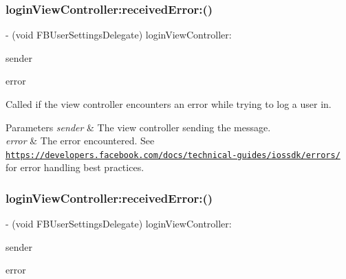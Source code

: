 \subsubsection{\texorpdfstring{login\+View\+Controller\+:received\+Error\+:()}{loginViewController:receivedError:()}\hspace{0.1cm}{\footnotesize\ttfamily [4/5]}}
{\footnotesize\ttfamily -\/ (void F\+B\+User\+Settings\+Delegate) login\+View\+Controller\+: \begin{DoxyParamCaption}\item[{(id)}]{sender }\item[{receivedError:(N\+S\+Error $\ast$)}]{error }\end{DoxyParamCaption}\hspace{0.3cm}{\ttfamily [optional]}}

Called if the view controller encounters an error while trying to log a user in.


\begin{DoxyParams}{Parameters}
{\em sender} & The view controller sending the message. \\
\hline
{\em error} & The error encountered.  See \href{https://developers.facebook.com/docs/technical-guides/iossdk/errors/}{\tt https\+://developers.\+facebook.\+com/docs/technical-\/guides/iossdk/errors/} for error handling best practices. \\
\hline
\end{DoxyParams}
\mbox{\label{protocolFBUserSettingsDelegate_01-p_aa7340081c0402e123cdde904f5cf2c91}} 
\subsubsection{\texorpdfstring{login\+View\+Controller\+:received\+Error\+:()}{loginViewController:receivedError:()}\hspace{0.1cm}{\footnotesize\ttfamily [5/5]}}
{\footnotesize\ttfamily -\/ (void F\+B\+User\+Settings\+Delegate) login\+View\+Controller\+: \begin{DoxyParamCaption}\item[{(id)}]{sender }\item[{receivedError:(N\+S\+Error $\ast$)}]{error }\end{DoxyParamCaption}\hspace{0.3cm}{\ttfamily [optional]}}

